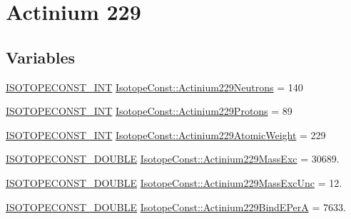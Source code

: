 \hypertarget{group___isotope_const-_actinium-_ac229}{}\section{Actinium 229}
\label{group___isotope_const-_actinium-_ac229}
\subsection*{Variables}
\begin{DoxyCompactItemize}
\item 
\mbox{\hyperlink{group___isotope_const-_macros_ga5f18360b3e99483a35c32d789e62621c}{I\+S\+O\+T\+O\+P\+E\+C\+O\+N\+S\+T\+\_\+\+I\+NT}} \mbox{\hyperlink{group___isotope_const-_actinium-_ac229_ga231e6fec1b379981ea430a5bf9cdddff}{Isotope\+Const\+::\+Actinium229\+Neutrons}} = 140
\item 
\mbox{\hyperlink{group___isotope_const-_macros_ga5f18360b3e99483a35c32d789e62621c}{I\+S\+O\+T\+O\+P\+E\+C\+O\+N\+S\+T\+\_\+\+I\+NT}} \mbox{\hyperlink{group___isotope_const-_actinium-_ac229_gadc85c7052583aad372739b15636de2ab}{Isotope\+Const\+::\+Actinium229\+Protons}} = 89
\item 
\mbox{\hyperlink{group___isotope_const-_macros_ga5f18360b3e99483a35c32d789e62621c}{I\+S\+O\+T\+O\+P\+E\+C\+O\+N\+S\+T\+\_\+\+I\+NT}} \mbox{\hyperlink{group___isotope_const-_actinium-_ac229_ga52e367a27c3e208dcb3d9790a1bf7ccb}{Isotope\+Const\+::\+Actinium229\+Atomic\+Weight}} = 229
\item 
\mbox{\hyperlink{group___isotope_const-_macros_ga8f45a7272ce02c0b4c65c44636ed719a}{I\+S\+O\+T\+O\+P\+E\+C\+O\+N\+S\+T\+\_\+\+D\+O\+U\+B\+LE}} \mbox{\hyperlink{group___isotope_const-_actinium-_ac229_gaf615c63587c57ac4ab89bbd935eb1d82}{Isotope\+Const\+::\+Actinium229\+Mass\+Exc}} = 30689.
\item 
\mbox{\hyperlink{group___isotope_const-_macros_ga8f45a7272ce02c0b4c65c44636ed719a}{I\+S\+O\+T\+O\+P\+E\+C\+O\+N\+S\+T\+\_\+\+D\+O\+U\+B\+LE}} \mbox{\hyperlink{group___isotope_const-_actinium-_ac229_gae7e5f51f6d18af6f0fbacc61239e2d60}{Isotope\+Const\+::\+Actinium229\+Mass\+Exc\+Unc}} = 12.
\item 
\mbox{\hyperlink{group___isotope_const-_macros_ga8f45a7272ce02c0b4c65c44636ed719a}{I\+S\+O\+T\+O\+P\+E\+C\+O\+N\+S\+T\+\_\+\+D\+O\+U\+B\+LE}} \mbox{\hyperlink{group___isotope_const-_actinium-_ac229_gac5c08b4adec3f89736bedc62319cc436}{Isotope\+Const\+::\+Actinium229\+Bind\+E\+PerA}} = 7633.
\item 

\end{DoxyCompactItemize}
